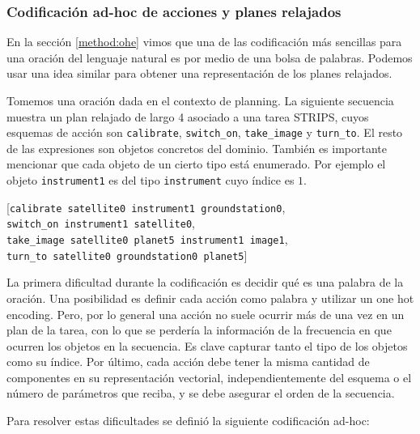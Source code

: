 \subsubsection{Codificación ad-hoc de acciones y planes relajados}
\label{method:vectorization}

En la sección \ref{method:ohe} vimos que una de las codificación más sencillas
para una oración del lenguaje natural es por medio de una bolsa de palabras.
Podemos usar una idea similar para obtener una representación de los
planes relajados.

Tomemos una oración dada en el contexto de planning. La siguiente secuencia
muestra un plan relajado de largo 4 asociado a una tarea STRIPS, cuyos esquemas
de acción son \verb|calibrate|, \verb|switch_on|, \verb|take_image| y
\verb|turn_to|. El resto de las expresiones son objetos concretos del dominio.
También es importante mencionar que cada objeto de un cierto tipo está
enumerado. Por ejemplo el objeto \verb|instrument1| es del tipo
\verb|instrument| cuyo índice es $1$. 

\begin{center}
    [\verb|calibrate satellite0 instrument1 groundstation0|, \\
    \verb|switch_on instrument1 satellite0|, \\
    \verb|take_image satellite0 planet5 instrument1 image1|, \\
    \verb|turn_to satellite0 groundstation0 planet5|] \\
\end{center}

La primera dificultad durante la codificación es decidir qué es una palabra de
la oración. Una posibilidad es definir cada acción como palabra y utilizar un
one hot encoding. Pero, por lo general una acción no suele ocurrir más de una
vez en un plan de la tarea, con lo que se perdería la información de la
frecuencia en que ocurren los objetos en la secuencia. Es clave capturar tanto
el tipo de los objetos como su índice. Por último, cada acción debe tener la
misma cantidad de componentes en su representación vectorial, independientemente
del esquema o el número de parámetros que reciba, y se debe asegurar el orden de
la secuencia.

Para resolver estas dificultades se definió la siguiente codificación ad-hoc:

